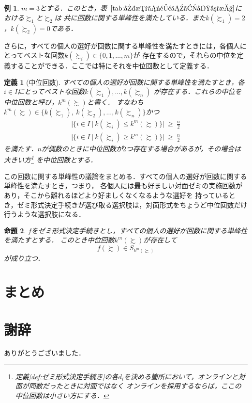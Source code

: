 \documentclass[dvipdfmx]{jsarticle}
\newtheorem{definition}{定義}
\newtheorem{proposition}[definition]{命題}
\newtheorem{example}{例}
\begin{document}
\begin{example}
  $m=3$とする．このとき，表~$\ref{tab:回数に関する単峰性}$における$\succsim_1$と$\succsim_2$は
  共に回数に関する単峰性を満たしている．また$k(\succsim_1) = 2$，$k(\succsim_2) = 0$である．
\end{example}

さらに，すべての個人の選好が回数に関する単峰性を満たすときには，各個人にとってベストな回数$k(\succsim_i) \in \{0,1,\ldots,m\}$が
存在するので，それらの中位を定義することができる．ここでは特にそれを中位回数として定義する．

\begin{definition}[中位回数]
  すべての個人の選好が回数に関する単峰性を満たすとき，各$i \in I$にとってベストな回数$k(\succsim_1),\ldots,k(\succsim_n)$
  が存在する．これらの中位を中位回数と呼び，$k^m(\succsim)$と書く．
  すなわち$k^m(\succsim) \in \{k(\succsim_1),\ k(\succsim_2), \ldots, k(\succsim_n) \}$かつ
  \begin{gather*}
    |\{i \in I \ | \ k(\succsim_i) \leq k^m(\succsim) \}| \ \geq \ \frac{n}{2} \\
    |\{i \in I \ | \ k(\succsim_i) \geq k^m(\succsim) \}| \ \geq \ \frac{n}{2}
  \end{gather*}
  を満たす．$n$が偶数のときに中位回数が$2$つ存在する場合があるが，その場合は大きい方\footnote{
    定義\ref{def:ゼミ形式決定手続き}の各$d_i$を決める箇所において，オンラインと対面が同数だったときに対面ではなく
    オンラインを採用するならば，ここの中位回数は小さい方にする．
  }
  を中位回数とする．
\end{definition}

この回数に関する単峰性の議論をまとめる．すべての個人の選好が回数に関する単峰性を満たすとき，つまり，
各個人には最も好ましい対面ゼミの実施回数があり，そこから離れるほどより好ましくなくなるような選好を
持っているとき，ゼミ形式決定手続きが選び取る選択肢は，対面形式をちょうど中位回数だけ行うような選択肢になる．

\begin{proposition}
  $f$をゼミ形式決定手続きとし，すべての個人の選好が回数に関する単峰性を満たすとする．
  このとき中位回数$k^m(\succsim)$が存在して
  \[
    f(\succsim) \in S_{k^m(\succsim)}
  \]
  が成り立つ．
\end{proposition}

\section{まとめ}

\section*{謝辞}
ありがとうございました．
\end{document}
